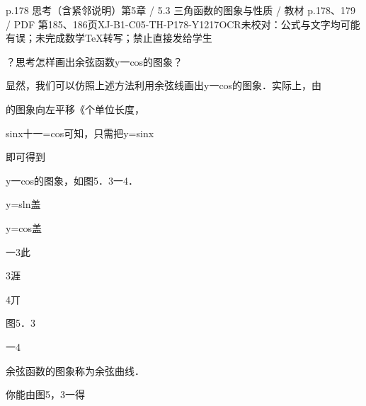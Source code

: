 \begin{bankitem}{p.178 思考（含紧邻说明）}{第5章 / 5.3 三角函数的图象与性质 / 教材 p.178、179 / PDF 第185、186页}{XJ-B1-C05-TH-P178-Y1217}{OCR未校对：公式与文字均可能有误；未完成数学TeX转写；禁止直接发给学生}
\begin{ocrdraft}
\par
？思考怎样画出余弦函数y一cos的图象？
\par
显然，我们可以仿照上述方法利用余弦线画出y一cos的图象．实际上，由
\par
的图象向左平移《个单位长度，
\par
sinx十一=cos可知，只需把y=sinx
\par
即可得到
\par
y一cos的图象，如图5．3一4．
\par
y=sln盖
\par
y=cos盖
\par
一3此
\par
3涯
\par
4丌
\par
图5．3
\par
一4
\par
[教材p.179 / PDF第186页]
\par
余弦函数的图象称为余弦曲线．
\par
你能由图5，3一得
\end{ocrdraft}
\end{bankitem}
